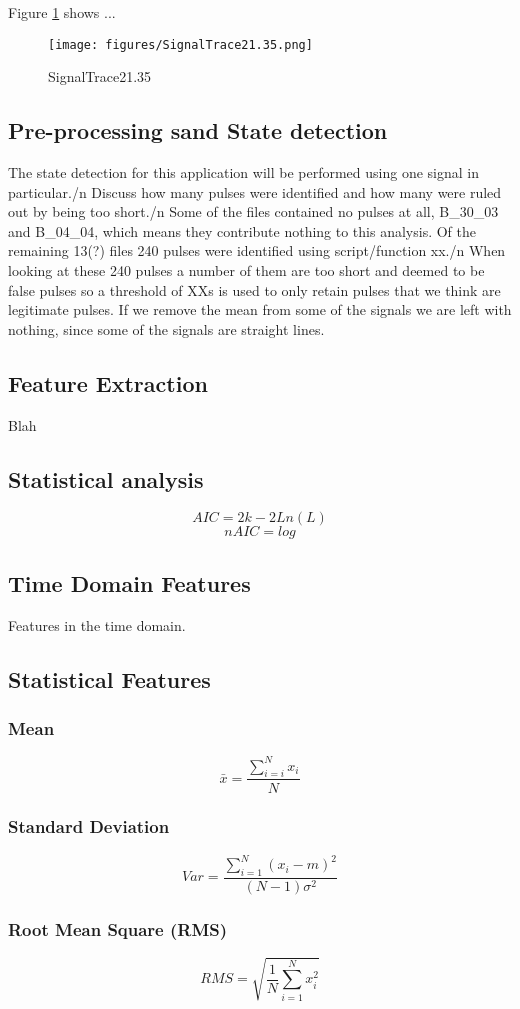 \documentclass{article}
\begin{document}
Figure \ref{fig:SignalTrace21.35} shows ...
\begin{figure}[!ht]
    \centering
    \texttt{[image: figures/SignalTrace21.35.png]}
    \caption{SignalTrace21.35}
    \label{fig:SignalTrace21.35}
\end{figure}
\subsection{Pre-processing sand State detection}
The state detection for this application will be performed using one signal in particular./n
Discuss how many pulses were identified and how many were ruled out by being too short./n
Some of the files contained no pulses at all, B\_30\_03 and B\_04\_04, which means they contribute nothing to this analysis.
Of the remaining 13(?) files 240 pulses were identified using script/function xx./n
When looking at these 240 pulses a number of them are too short and deemed to be false pulses so a threshold of XXs is used to only retain pulses that we think are legitimate pulses.
If we remove the mean from some of the signals we are left with nothing, since some of the signals are straight lines.
\subsection{Feature Extraction}
Blah
\subsection{Statistical analysis}
$$ AIC = 2k - 2Ln(L) $$  
$$ nAIC = log $$
\subsection{Time Domain Features} 	
Features in the time domain.
\subsection{Statistical Features}
\subsubsection{Mean}
$$ \bar{x} = \frac{\sum^N_{i=i} x_i}{N} $$
\subsubsection{Standard Deviation}  
$$ Var =\frac{\sum^N_{i=1}(x_i-m)^2}{(N-1)\sigma^2} $$
\subsubsection{Root Mean Square (RMS)}
$$ RMS = \sqrt{\frac{1}{N} \sum^N_{i=1}x^2_i} $$
\end{document}
